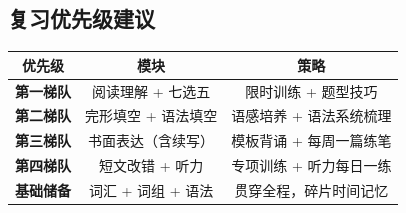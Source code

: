 \subsection{复习优先级建议}

\begin{center}
\begin{tabular}{c|c|c}
\textbf{优先级} & \textbf{模块} & \textbf{策略} \\ \toprule
\textbf{第一梯队} & 阅读理解 + 七选五 & 限时训练 + 题型技巧 \\
\textbf{第二梯队} & 完形填空 + 语法填空 & 语感培养 + 语法系统梳理 \\
\textbf{第三梯队} & 书面表达（含续写） & 模板背诵 + 每周一篇练笔 \\
\textbf{第四梯队} & 短文改错 + 听力 & 专项训练 + 听力每日一练 \\
\textbf{基础储备} & 词汇 + 词组 + 语法 & 贯穿全程，碎片时间记忆 \\
\bottomrule
\end{tabular}
\end{center}
